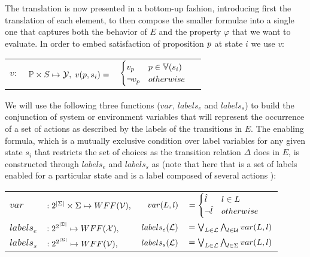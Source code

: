 The translation is now presented in a bottom-up fashion, introducing first the translation of each element, to then compose the smaller formulae into a single one that captures both the behavior of $E$ and the property $\varphi$ that we want to evaluate. In order to embed satisfaction of proposition $p$ at state $i$ we use $v$:
\begin{center}
	\begin{tabular}{r r r l}
$v:$ & $\mathbb{P} \times S \mapsto {\ensuremath{\mathcal{Y}}},$
$
v(p,s_i) = $ & $\begin{cases}
v_{p} & p \in \mathbb{V}(s_i) \\
\neg v_{p} & otherwise
\end{cases}
$
\end{tabular}
\end{center}
We will use the following three functions ($var$, $labels_e$ and $labels_s$) to build the conjunction of system or environment variables that will represent the occurrence of a set of actions as described by the labels of the transitions in $E$.
The enabling formula, which is a mutually exclusive condition over label variables for any given state $s_i$ that restricts the set of choices as the transition relation $\Delta$ does in $E$, is constructed through $labels_e$ and $labels_s$ as (note that here that  is a set of labels \actionLabel enabled for a particular state and \actionLabel is a label composed of several actions \action ):
\vspace{1em}
\footnotesize
	\begin{tabular}{l l r l}
		$var$&$:2^{|\Sigma|}\times \Sigma \mapsto WFF({\mathcal{V}}),$ &
		$
		var(L, l)$&$= \begin{cases}
		\hat{l}_{} & l \in L \\
		\neg \hat{l}_{} & otherwise
		\end{cases}
		$\\
		$labels_e$&$:2^{2^{|\Sigma|}}\mapsto WFF({\mathcal{X}}),$ &
		$labels_e(\mathcal{L})$&$= \bigvee_{L \in \mathcal{L}}\bigwedge_{l \in \mathcal{U}}var(L, l)$\\
		$labels_s$&$:2^{2^{|\Sigma|}}\mapsto  WFF({\mathcal{V}}),$ &
		$labels_s(\mathcal{L})$&$= \bigvee_{L \in \mathcal{L}}\bigwedge_{l \in \Sigma}var(L, l)$\\
	\end{tabular}
\normalsize

